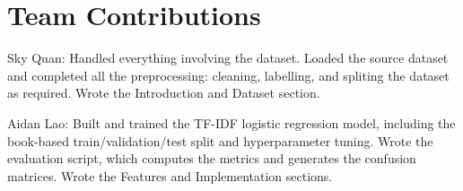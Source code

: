 \documentclass[11pt]{article}
\begin{document}








\section*{Team Contributions}


Sky Quan: Handled everything involving the dataset. Loaded the source dataset and completed all the preprocessing: cleaning, labelling, and spliting the dataset as required. Wrote the Introduction and Dataset section.

Aidan Lao: Built and trained the TF-IDF logistic regression model, including the book-based train/validation/test split and hyperparameter tuning. Wrote the evaluation script, which computes the metrics and generates the confusion matrices. Wrote the Features and Implementation sections.
\end{document}
